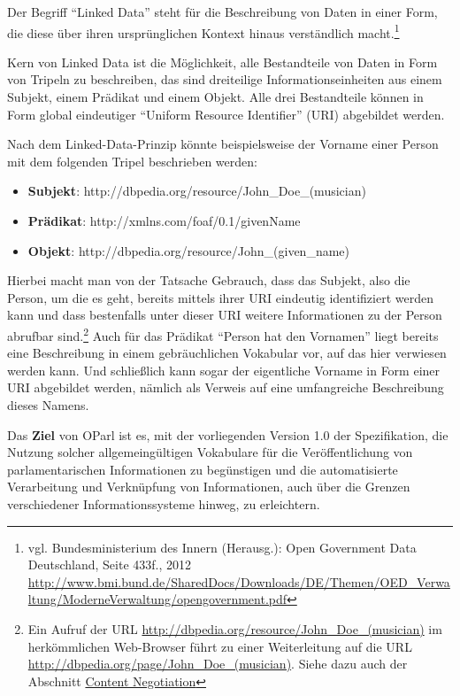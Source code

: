\documentclass[,a4paper]{article}
\begin{document}
Der Begriff ``Linked Data'' steht für die Beschreibung von Daten in
einer Form, die diese über ihren ursprünglichen Kontext hinaus
verständlich macht.\footnote{vgl. Bundesministerium des Innern
  (Herausg.): Open Government Data Deutschland, Seite 433f., 2012
  \url{http://www.bmi.bund.de/SharedDocs/Downloads/DE/Themen/OED_Verwaltung/ModerneVerwaltung/opengovernment.pdf}}

Kern von Linked Data ist die Möglichkeit, alle Bestandteile von Daten in
Form von Tripeln zu beschreiben, das sind dreiteilige
Informationseinheiten aus einem Subjekt, einem Prädikat und einem
Objekt. Alle drei Bestandteile können in Form global eindeutiger
``Uniform Resource Identifier'' (URI) abgebildet werden.

Nach dem Linked-Data-Prinzip könnte beispielsweise der Vorname einer
Person mit dem folgenden Tripel beschrieben werden:

\begin{itemize}
\itemsep1pt\parskip0pt
\item
  \textbf{Subjekt}: http://dbpedia.org/resource/John\_Doe\_(musician)
\item
  \textbf{Prädikat}: http://xmlns.com/foaf/0.1/givenName
\item
  \textbf{Objekt}: http://dbpedia.org/resource/John\_(given\_name)
\end{itemize}

Hierbei macht man von der Tatsache Gebrauch, dass das Subjekt, also die
Person, um die es geht, bereits mittels ihrer URI eindeutig
identifiziert werden kann und dass bestenfalls unter dieser URI weitere
Informationen zu der Person abrufbar sind.\footnote{Ein Aufruf der URL
  \url{http://dbpedia.org/resource/John_Doe_(musician)} im herkömmlichen
  Web-Browser führt zu einer Weiterleitung auf die URL
  \url{http://dbpedia.org/page/John_Doe_(musician)}. Siehe dazu auch der
  Abschnitt \hyperref[contentux5fnegotiation]{Content Negotiation}} Auch
für das Prädikat ``Person hat den Vornamen'' liegt bereits eine
Beschreibung in einem gebräuchlichen Vokabular vor, auf das hier
verwiesen werden kann. Und schließlich kann sogar der eigentliche
Vorname in Form einer URI abgebildet werden, nämlich als Verweis auf
eine umfangreiche Beschreibung dieses Namens.

Das \textbf{Ziel} von OParl ist es, mit der vorliegenden Version 1.0 der
Spezifikation, die Nutzung solcher allgemeingültigen Vokabulare für die
Veröffentlichung von parlamentarischen Informationen zu begünstigen und
die automatisierte Verarbeitung und Verknüpfung von Informationen, auch
über die Grenzen verschiedener Informationssysteme hinweg, zu
erleichtern.
\end{document}
